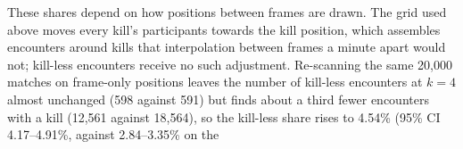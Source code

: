 These shares depend on how positions between frames are drawn. The grid used above moves every kill's
participants towards the kill position, which assembles encounters around kills that interpolation
between frames a minute apart would not; kill-less encounters receive no such adjustment. Re-scanning
the same 20,000 matches on frame-only positions leaves the number of kill-less encounters at $k = 4$
almost unchanged (598 against 591) but finds about a third fewer encounters with a kill (12,561 against
18,564), so the kill-less share rises to 4.54\% (95\% CI 4.17--4.91\%, against 2.84--3.35\% on the
